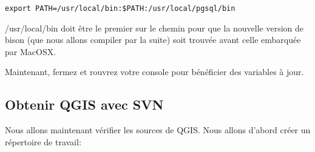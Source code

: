 \begin{verbatim}
export PATH=/usr/local/bin:$PATH:/usr/local/pgsql/bin 
\end{verbatim}

/usr/local/bin doit être le premier sur le chemin pour que la nouvelle version de bison (que nous allons compiler par la suite) soit trouvée avant celle embarquée par MacOSX.

Maintenant, fermez et rouvrez votre console pour bénéficier des variables à jour.

% 
% 
% 
% 
% 
% 
% 
% 
% 
% 
% 

\subsection{Obtenir QGIS avec SVN}
Nous allons maintenant vérifier les sources de QGIS. Nous allons d'abord créer un répertoire de travail:


